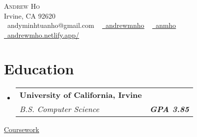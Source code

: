 \documentclass[letterpaper,11pt]{article}
\makeatletter
\newcommand{\resumeSubheading}[4]{
  \vspace{-2pt}\item
    \begin{tabular*}{1.0\textwidth}[t]{l@{\extracolsep{\fill}}r}
      \textbf{#1} & \textbf{\small #2} \\
      \textit{\small#3} & \textit{\small #4} \\
    \end{tabular*}\vspace{-7pt}
}
\newcommand{\resumeSubHeadingListStart}{\begin{itemize}[leftmargin=0.0in, label={}]}
\newcommand{\resumeSubHeadingListEnd}{\end{itemize}}
\makeatother
\begin{document}

\begin{center}
    {\Huge \scshape Andrew Ho} \\ \vspace{1pt}
    Irvine, CA 92620 \\ \vspace{1pt}
    \raisebox{-0.2\height}\faEnvelope\  {andyminhtuanho@gmail.com} ~
    \href{https://linkedin.com/in/andrewmnho/}{\raisebox{-0.2\height}\faLinkedin\ \underline{andrewmnho}}  ~
    \href{https://github.com/}{\raisebox{-0.2\height}\faGithub\ \underline{anmho}}~
    \href{https://andrewmho.netlify.app//}{\raisebox{-0.2\height}\faGlobe\ \underline{andrewmho.netlify.app/}}
    \vspace{-8pt}
\end{center}


\section{Education}
\resumeSubHeadingListStart
\resumeSubheading
{University of California, Irvine \normalfont{\small{}}}
{\normalfont{Exp. June 2025}}
{B.S. Computer Science} {\textbf{GPA 3.85}}


\resumeSubHeadingListEnd

\vspace{-4pt}
\underline{Coursework}{}
\end{document}
